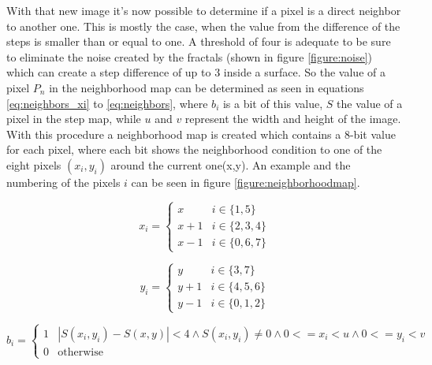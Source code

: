 \newpage
With that new image it's now possible to determine if a pixel is a direct neighbor to another one. This is mostly the case,
when the value from the difference of the steps is smaller than or equal to one. A threshold of four is adequate to be sure 
to eliminate the noise created by the fractals (shown in figure \vref{figure:noise}) 
which can create a step difference of up to 3 inside a surface. So the value of a pixel $P_n$ in the neighborhood map
can be determined as seen in equations \vref{eq:neighbors_xi} to \vref{eq:neighbors}, where $b_i$ is a bit of this value, 
$S$ the value of a pixel in the step map, while $u$ and $v$ represent the width and height of the image. With this procedure 
a neighborhood map is created which contains a 8-bit value for each pixel, where each bit shows the neighborhood 
condition to one of the eight pixels $(x_i,y_i)$ around the current one(x,y). An example and the numbering of the pixels $i$ 
can be seen in figure \vref{figure:neighborhoodmap}.

\begin{equation}
 x_i = \left\{ 
	 \begin{array}{ll}
	         x   & i \in \{1,5\} \\
	         x+1 & i \in \{2,3,4\} \\
	         x-1 & i \in \{0,6,7\} 
	 \end{array} 
\right.        
\label{eq:neighbors_xi} 
\end{equation}


\begin{equation}
 y_i = \left\{ 
	 \begin{array}{ll}
	         y   & i \in \{3,7\} \\
	         y+1 & i \in \{4,5,6\} \\
	         y-1 & i \in \{0,1,2\} 
	 \end{array} 
\right.        
\label{eq:neighbors_yi} 
\end{equation}



\begin{equation}
 b_i = \left\{ 
	 \begin{array}{ll}
	         1 & \left|S(x_i,y_i)-S(x,y)\right|<4  \wedge   S(x_i,y_i) \neq 0 \wedge 0<=x_i<u  \wedge 0<=y_i<v\\
	         0 & \mbox{otherwise} 
	 \end{array}
\right.        
\label{eq:neighbors_bit} 
\end{equation}

